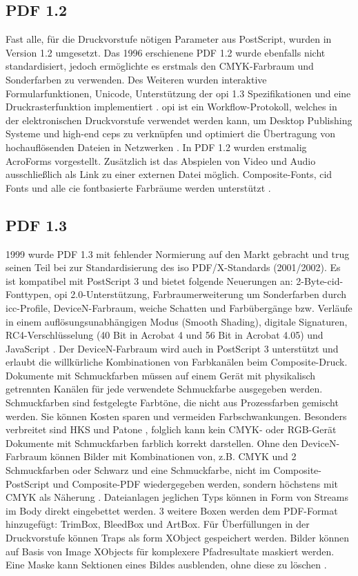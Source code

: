 \subsection{PDF 1.2}
Fast alle, für die Druckvorstufe nötigen Parameter aus PostScript, wurden in Version 1.2 umgesetzt. Das 1996 erschienene PDF 1.2 wurde ebenfalls nicht standardisiert, jedoch ermöglichte es erstmals den CMYK-Farbraum und Sonderfarben zu verwenden. Des Weiteren wurden interaktive Formularfunktionen, Unicode, Unterstützung der \gls{opi} 1.3 Spezifikationen und eine Druckrasterfunktion implementiert \cite{proj-consult}. \gls{opi} ist ein Workflow-Protokoll, welches in der elektronischen Druckvorstufe verwendet werden kann, um Desktop Publishing Systeme und high-end \gls{ceps} zu verknüpfen und optimiert die Übertragung von hochauflösenden Dateien in Netzwerken \cite{printwiki}. In PDF 1.2 wurden erstmalig AcroForms vorgestellt. Zusätzlich ist das Abspielen von Video und Audio ausschließlich als Link zu einer externen Datei möglich. Composite-Fonts, \gls{cid} Fonts und alle \gls{cie} fontbasierte Farbräume werden unterstützt \cite{schneeberger}.

\subsection{PDF 1.3}
1999 wurde PDF 1.3 mit fehlender Normierung auf den Markt gebracht und trug seinen Teil bei zur Standardisierung des \gls{iso} PDF/X-Standards (2001/2002). Es ist kompatibel mit PostScript 3 und bietet folgende Neuerungen an: 2-Byte-\gls{cid}-Fonttypen, \gls{opi} 2.0-Unterstützung, Farbraumerweiterung um Sonderfarben durch \gls{icc}-Profile, DeviceN-Farbraum, weiche Schatten und Farbübergänge bzw. Verläufe in einem auflösungsunabhängigen Modus (Smooth Shading), digitale Signaturen, RC4-Verschlüsselung (40 Bit in Acrobat 4 und 56 Bit in Acrobat 4.05) und JavaScript \cite{proj-consult, schneeberger}. Der DeviceN-Farbraum wird auch in PostScript 3 unterstützt und erlaubt die willkürliche Kombinationen von Farbkanälen beim Composite-Druck. Dokumente mit Schmuckfarben müssen auf einem Gerät mit physikalisch getrennten Kanälen für jede verwendete Schmuckfarbe ausgegeben werden. Schmuckfarben sind festgelegte Farbtöne, die nicht aus Prozessfarben gemischt werden. Sie können Kosten sparen und vermeiden Farbschwankungen. Besonders verbreitet sind HKS und Patone \cite{kompendium}, folglich kann kein CMYK- oder RGB-Gerät Dokumente mit Schmuckfarben farblich korrekt darstellen. Ohne den DeviceN-Farbraum können Bilder mit Kombinationen von, z.B. CMYK und 2 Schmuckfarben oder Schwarz und eine Schmuckfarbe, nicht im Composite-PostScript und Composite-PDF wiedergegeben werden, sondern höchstens mit CMYK als Näherung \cite{helios}. Dateianlagen jeglichen Typs können in Form von Streams im Body direkt eingebettet werden. 3 weitere Boxen werden dem PDF-Format hinzugefügt: TrimBox, BleedBox und ArtBox. Für Überfüllungen in der Druckvorstufe können Traps als form XObject gespeichert werden. Bilder können auf Basis von Image XObjects für komplexere Pfadresultate maskiert werden. Eine Maske kann Sektionen eines Bildes ausblenden, ohne diese zu löschen \cite{schneeberger}.

